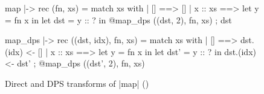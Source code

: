 \begin{figure}[tp]
\begin{minipage}{.40\columnwidth}
\begin{Datalang}
map |-> rec (fn, xs) =
  match xs with
  | [] ==> 
      []
  | x :: xs ==>
      let y = fn x in
      let dst = y :: ? in
      @map_dps ((dst, 2), fn, xs) ;
      dst
\end{Datalang}
\end{minipage}
\hfill
\begin{minipage}{.52\columnwidth}
\begin{Datalang}
map_dps |-> rec ((dst, idx), fn, xs) =
  match xs with
  | [] ==> 
      dst.(idx) <- []
  | x :: xs ==>
      let y = fn x in
      let dst' = y :: ? in
      dst.(idx) <- dst' ;
      @map_dps ((dst', 2), fn, xs)
\end{Datalang}
\end{minipage}
\caption{Direct and DPS transforms of \datalang|map| (\DataLang)}
\label{fig:map_tmc}
\end{figure}